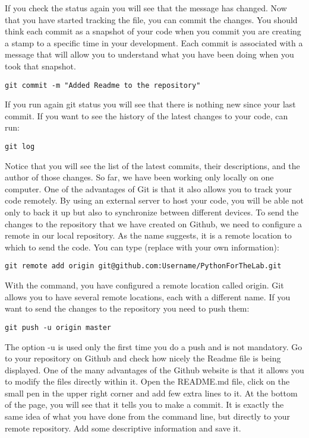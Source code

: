 If you check the status again you will see that the message has changed. Now that you have started tracking the file, you can commit the changes. You should think each commit as a snapshot of your code when you commit you are creating a stamp to a specific time in your development. Each commit is associated with a message that will allow you to understand what you have been doing when you took that snapshot.
\begin{verbatim}
git commit -m "Added Readme to the repository" 
\end{verbatim}

If you run again git status you will see that there is nothing new since your last commit. If you want to see the history of the latest changes to your code, can run:
\begin{verbatim}
git log 
\end{verbatim}

Notice that you will see the list of the latest commits, their descriptions, and the author of those changes. So far, we have been working only locally on one computer. One of the advantages of Git is that it also allows you to track your code remotely. By using an external server to host your code, you will be able not only to back it up but also to synchronize between different devices. To send the changes to the repository that we have created on Github, we need to configure a remote in our local repository. As the name suggests, it is a remote location to which to send the code. You can type (replace with your own information):
\begin{verbatim}
git remote add origin git@github.com:Username/PythonForTheLab.git
\end{verbatim}

With the command, you have configured a remote location called origin. Git allows you to have several remote locations, each with a different name. If you want to send the changes to the repository you need to push them:
\begin{verbatim}
git push -u origin master 
\end{verbatim}
The option -u is used only the first time you do a push and is not mandatory. Go to your repository on Github and check how nicely the Readme file is being displayed. One of the many advantages of the Github website is that it allows you to modify the files directly within it. Open the README.md file, click on the small pen in the upper right corner and add few extra lines to it. At the bottom of the page, you will see that it tells you to make a commit. It is exactly the same idea of what you have done from the command line, but directly to your remote repository. Add some descriptive information and save it.

